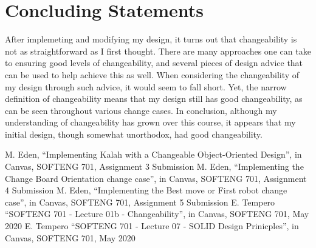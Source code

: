 \documentclass[10pt, a4paper, conference]{IEEEtran}
\begin{document}
\section{Concluding Statements}
After implemeting and modifying my design, it turns out that changeability is 
not as straightforward as I first thought. There are many approaches one can
take to ensuring good levels of changeability, and several pieces of design
advice that can be used to help achieve this as well. When considering the
changeability of my design through such advice, it would seem to fall short.
Yet, the narrow definition of changeability means that my design still has good
changeability, as can be seen throughout various change cases. In conclusion,
although my understanding of changeability has grown over this course, it
appears that my initial design, though somewhat unorthodox, had good
changeability.

\begin{thebibliography}{00}
   M. Eden, ``Implementing Kalah with a Changeable
    Object-Oriented Design'', in Canvas, SOFTENG 701, Assignment 3 
    Submission
   M. Eden, ``Implementing the Change Board Orientation
    change case'', in Canvas, SOFTENG 701, Assignment 4 Submission
   M. Eden, ``Implementing the Best move or First robot
    change case'', in Canvas, SOFTENG 701, Assignment 5 Submission
   E. Tempero ``SOFTENG 701 - Lecture 01b - Changeability'',  in Canvas, SOFTENG 701, May 2020
   E. Tempero ``SOFTENG 701 - Lecture 07 - SOLID Design Prinicples'',  in Canvas, SOFTENG 701, May 2020
\end{thebibliography}
\end{document}
